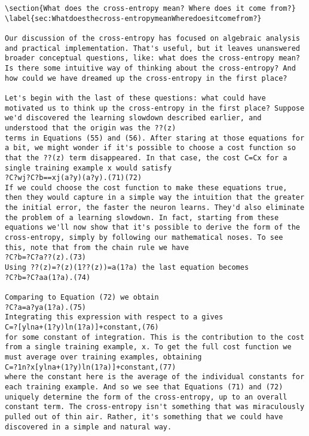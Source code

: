 \begin{lstlisting}
\section{What does the cross-entropy mean? Where does it come from?}
\label{sec:Whatdoesthecross-entropymeanWheredoesitcomefrom?}

Our discussion of the cross-entropy has focused on algebraic analysis and practical implementation. That's useful, but it leaves unanswered broader conceptual questions, like: what does the cross-entropy mean? Is there some intuitive way of thinking about the cross-entropy? And how could we have dreamed up the cross-entropy in the first place?

Let's begin with the last of these questions: what could have motivated us to think up the cross-entropy in the first place? Suppose we'd discovered the learning slowdown described earlier, and understood that the origin was the ??(z)
terms in Equations (55) and (56). After staring at those equations for a bit, we might wonder if it's possible to choose a cost function so that the ??(z) term disappeared. In that case, the cost C=Cx for a single training example x would satisfy 
?C?wj?C?b==xj(a?y)(a?y).(71)(72)
If we could choose the cost function to make these equations true, then they would capture in a simple way the intuition that the greater the initial error, the faster the neuron learns. They'd also eliminate the problem of a learning slowdown. In fact, starting from these equations we'll now show that it's possible to derive the form of the cross-entropy, simply by following our mathematical noses. To see this, note that from the chain rule we have 
?C?b=?C?a??(z).(73)
Using ??(z)=?(z)(1??(z))=a(1?a) the last equation becomes 
?C?b=?C?aa(1?a).(74)

Comparing to Equation (72) we obtain 
?C?a=a?ya(1?a).(75)
Integrating this expression with respect to a gives 
C=?[ylna+(1?y)ln(1?a)]+constant,(76)
for some constant of integration. This is the contribution to the cost from a single training example, x. To get the full cost function we must average over training examples, obtaining 
C=?1n?x[ylna+(1?y)ln(1?a)]+constant,(77)
where the constant here is the average of the individual constants for each training example. And so we see that Equations (71) and (72) uniquely determine the form of the cross-entropy, up to an overall constant term. The cross-entropy isn't something that was miraculously pulled out of thin air. Rather, it's something that we could have discovered in a simple and natural way.


\end{lstlisting}
